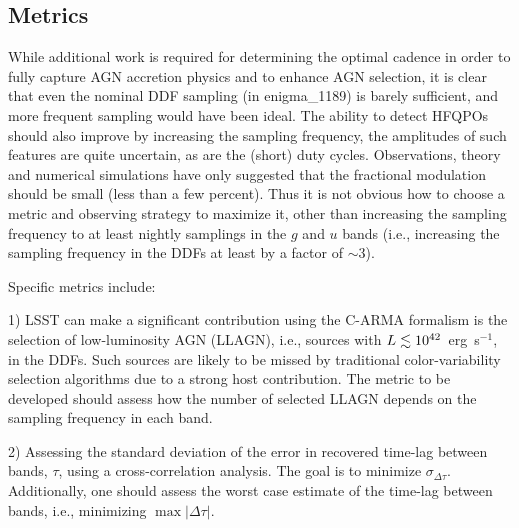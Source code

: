 
\subsection{Metrics}
\label{sec:\secname:metrics}





While additional work is required for determining the optimal cadence in order
to fully capture AGN accretion physics and to enhance AGN selection, it is clear
that even the nominal DDF sampling (in enigma\_1189) is barely sufficient, and
more frequent sampling would have been ideal. The ability to detect HFQPOs
should also improve by increasing the sampling frequency, the amplitudes of such
features are quite uncertain, as are the (short) duty cycles. Observations,
theory and numerical simulations have only suggested that the fractional
modulation should be small (less than a few percent). Thus it is not obvious how
to choose a metric and observing strategy to maximize it, other than increasing
the sampling frequency to at least nightly samplings in the $g$ and $u$ bands
(i.e., increasing the sampling frequency in the DDFs at least by a factor of
$\sim 3$).

Specific metrics include:

1) LSST can make a significant contribution using
the C-ARMA formalism is the selection of low-luminosity AGN (LLAGN), i.e.,
sources with $L \lesssim 10^{42}$~erg~s$^{-1}$, in the DDFs. Such sources are
likely to be missed by traditional color-variability selection algorithms due to
a strong host contribution. The metric to be developed should assess how the
number of selected LLAGN depends on the sampling frequency in each band.

2) Assessing the standard deviation of the error in recovered time-lag between
bands, $\tau$, using a cross-correlation analysis. The goal is to minimize
$\sigma_{\Delta \tau}$. Additionally, one should assess the worst case estimate of
the time-lag between bands, i.e., minimizing $\max \vert \Delta \tau \vert$.

